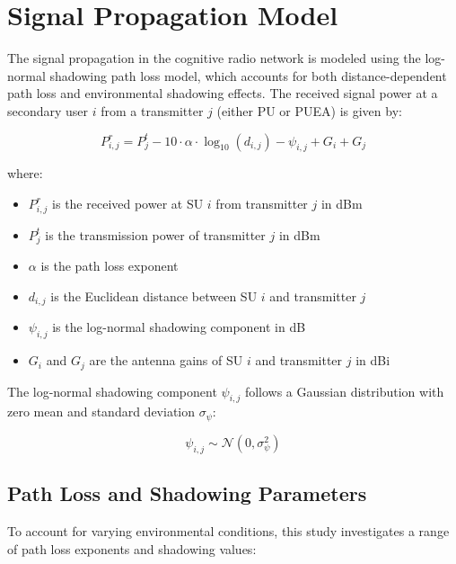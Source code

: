 \section{Signal Propagation Model}

The signal propagation in the cognitive radio network is modeled using the log-normal shadowing path loss model, which accounts for both distance-dependent path loss and environmental shadowing effects. The received signal power at a secondary user $i$ from a transmitter $j$ (either PU or PUEA) is given by:

\begin{equation}
    P_{i,j}^r = P_j^t - 10 \cdot \alpha \cdot \log_{10}(d_{i,j}) - \psi_{i,j} + G_i + G_j
\end{equation}

where:
\begin{itemize}
    \item $P_{i,j}^r$ is the received power at SU $i$ from transmitter $j$ in dBm
    \item $P_j^t$ is the transmission power of transmitter $j$ in dBm
    \item $\alpha$ is the path loss exponent
    \item $d_{i,j}$ is the Euclidean distance between SU $i$ and transmitter $j$
    \item $\psi_{i,j}$ is the log-normal shadowing component in dB
    \item $G_i$ and $G_j$ are the antenna gains of SU $i$ and transmitter $j$ in dBi
\end{itemize}

The log-normal shadowing component $\psi_{i,j}$ follows a Gaussian distribution with zero mean and standard deviation $\sigma_{\psi}$:

\begin{equation}
    \psi_{i,j} \sim \mathcal{N}(0, \sigma_{\psi}^2)
\end{equation}

\subsection{Path Loss and Shadowing Parameters}

To account for varying environmental conditions, this study investigates a range of path loss exponents and shadowing values:


